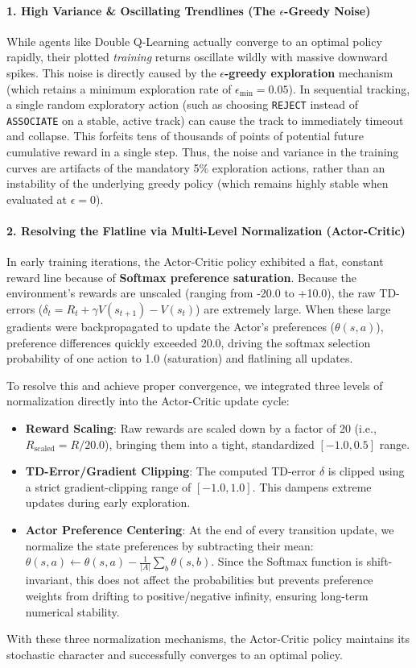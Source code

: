 \documentclass[12pt,a4paper]{article}
\begin{document}
\paragraph{1. High Variance \& Oscillating Trendlines (The $\epsilon$-Greedy Noise)}
While agents like Double Q-Learning actually converge to an optimal policy rapidly, their plotted \textit{training} returns oscillate wildly with massive downward spikes. This noise is directly caused by the \textbf{$\epsilon$-greedy exploration} mechanism (which retains a minimum exploration rate of $\epsilon_{\text{min}} = 0.05$). In sequential tracking, a single random exploratory action (such as choosing \texttt{REJECT} instead of \texttt{ASSOCIATE} on a stable, active track) can cause the track to immediately timeout and collapse. This forfeits tens of thousands of points of potential future cumulative reward in a single step. Thus, the noise and variance in the training curves are artifacts of the mandatory 5\% exploration actions, rather than an instability of the underlying greedy policy (which remains highly stable when evaluated at $\epsilon = 0$).

\paragraph{2. Resolving the Flatline via Multi-Level Normalization (Actor-Critic)}
In early training iterations, the Actor-Critic policy exhibited a flat, constant reward line because of \textbf{Softmax preference saturation}. Because the environment's rewards are unscaled (ranging from -20.0 to +10.0), the raw TD-errors ($\delta_t = R_t + \gamma V(s_{t+1}) - V(s_t)$) are extremely large. When these large gradients were backpropagated to update the Actor's preferences ($\theta(s, a)$), preference differences quickly exceeded 20.0, driving the softmax selection probability of one action to 1.0 (saturation) and flatlining all updates.

To resolve this and achieve proper convergence, we integrated three levels of normalization directly into the Actor-Critic update cycle:
\begin{itemize}
    \item \textbf{Reward Scaling}: Raw rewards are scaled down by a factor of 20 (i.e., $R_{\text{scaled}} = R / 20.0$), bringing them into a tight, standardized $[-1.0, 0.5]$ range.
    \item \textbf{TD-Error/Gradient Clipping}: The computed TD-error $\delta$ is clipped using a strict gradient-clipping range of $[-1.0, 1.0]$. This dampens extreme updates during early exploration.
    \item \textbf{Actor Preference Centering}: At the end of every transition update, we normalize the state preferences by subtracting their mean: $\theta(s, a) \leftarrow \theta(s, a) - \frac{1}{|A|} \sum_b \theta(s, b)$. Since the Softmax function is shift-invariant, this does not affect the probabilities but prevents preference weights from drifting to positive/negative infinity, ensuring long-term numerical stability.
\end{itemize}
With these three normalization mechanisms, the Actor-Critic policy maintains its stochastic character and successfully converges to an optimal policy.
\end{document}
